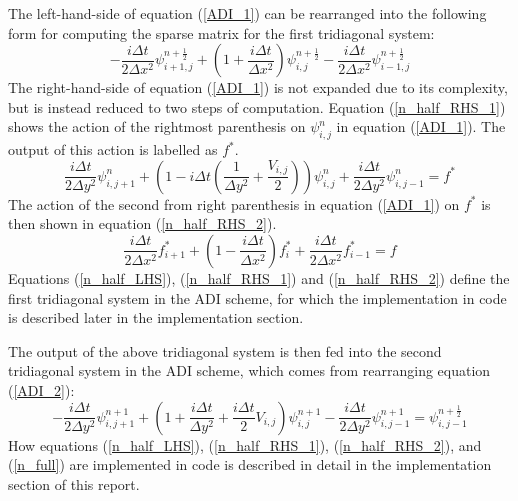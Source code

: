 \documentclass[10pt]{article}
\begin{document}
The left-hand-side of equation (\ref{ADI_1}) can be rearranged into the following form for 
computing the sparse matrix for the first tridiagonal system:
\begin{equation}\label{n_half_LHS}
-\frac{i \Delta t}{2 \Delta x^2} \psi_{i+1,j}^{n+\frac{1}{2}} + \left(1 + 
\frac{i \Delta t}{\Delta x^2} \right) \psi_{i,j}^{n+\frac{1}{2}} - \frac{i \Delta t}{2 \Delta x^2} 
\psi_{i-1,j}^{n+\frac{1}{2}}
\end{equation}
The right-hand-side of equation (\ref{ADI_1}) is not expanded due to its complexity, but is instead
reduced to two steps of computation. Equation (\ref{n_half_RHS_1}) shows the action of the rightmost
parenthesis on $\psi_{i,j}^n$ in equation (\ref{ADI_1}). The output of this action is labelled as 
$f^*$.
\begin{equation}\label{n_half_RHS_1}
\frac{i \Delta t}{2 \Delta y^2} \psi_{i,j+1}^{n} + \left(1 - i \Delta t \left(\frac{1}{\Delta y^2}
+ \frac{V_{i,j}}{2} \right) \right) \psi_{i,j}^n + \frac{i \Delta t}{2 \Delta y^2} \psi_{i,j-1}^n
= f^*
\end{equation}
The action of the second from right parenthesis in equation (\ref{ADI_1}) on $f^*$ is then
shown in equation (\ref{n_half_RHS_2}).
\begin{equation}\label{n_half_RHS_2}
\frac{i \Delta t}{2 \Delta x^2} f_{i+1}^* + \left(1 - \frac{i \Delta t}{\Delta x^2} \right) f_i^*
+ \frac{i \Delta t}{2 \Delta x^2} f_{i-1}^* = f
\end{equation}
Equations (\ref{n_half_LHS}), (\ref{n_half_RHS_1}) and (\ref{n_half_RHS_2}) define the first
tridiagonal system in the ADI scheme, for which the implementation in code is described later in the 
implementation section. 

The output of the above tridiagonal system is then fed into the second tridiagonal system in the ADI 
scheme, which comes from rearranging equation (\ref{ADI_2}):
\begin{equation}\label{n_full}
-\frac{i \Delta t}{2 \Delta y^2} \psi_{i,j+1}^{n+1} + \left(1 + \frac{i \Delta t}{\Delta y^2} + 
\frac{i \Delta t}{2} V_{i,j} \right) \psi_{i,j}^{n+1} - \frac{i \Delta t}{2 \Delta y^2} 
\psi_{i,j-1}^{n+1} = \psi_{i,j-1}^{n+\frac{1}{2}}
\end{equation}
How equations (\ref{n_half_LHS}), (\ref{n_half_RHS_1}), (\ref{n_half_RHS_2}), and (\ref{n_full})
are implemented in code is described in detail in the implementation section of this report. 
\end{document}
